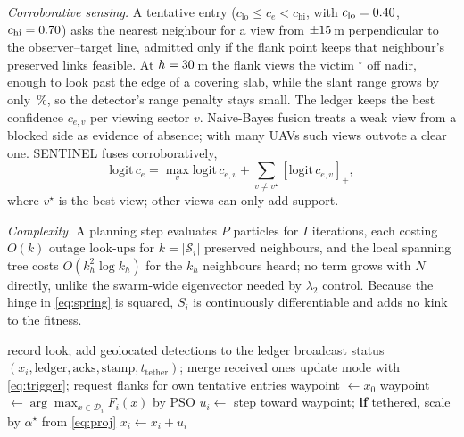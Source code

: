 \documentclass[conference]{IEEEtran}
\begin{document}
\emph{Corroborative sensing.} A tentative entry ($c_{\mathrm{lo}}\le c_e<c_{\mathrm{hi}}$, with
$c_{\mathrm{lo}}=0.40$, $c_{\mathrm{hi}}=0.70$) asks the nearest neighbour for a view from
$\pm15$\,m perpendicular to the observer--target line, admitted only if the flank point keeps
that neighbour's preserved links feasible. At $h=30$\,m the flank views the victim
\nFlankAngle$^\circ$ off nadir, enough to look past the edge of a covering slab, while the slant range
grows by only \nFlankSlant\,\%, so the detector's range penalty stays small. The ledger keeps the best confidence $c_{e,v}$ per viewing
sector $v$. Naive-Bayes fusion treats a weak view from a blocked side as evidence of absence; with many
UAVs such views outvote a clear one. SENTINEL fuses corroboratively,
\begin{equation}
\mathrm{logit}\,c_e=\max_v\mathrm{logit}\,c_{e,v}+\sum_{v\ne v^\star}[\mathrm{logit}\,c_{e,v}]_+,\label{eq:fusion}
\end{equation}
where $v^\star$ is the best view; other views can only add support.

\emph{Complexity.} A planning step evaluates $P$ particles for $I$ iterations, each costing $O(k)$
outage look-ups for $k=|\mathcal{S}_i|$ preserved neighbours, and the local spanning tree costs
$O(k_h^2\log k_h)$ for the $k_h$ neighbours heard; no term grows with $N$ directly, unlike the
swarm-wide eigenvector needed by $\lambda_2$ control. Because the hinge in \eqref{eq:spring} is
squared, $S_i$ is continuously differentiable and adds no kink to the fitness.

\begin{algorithm}[t]\small\caption{SENTINEL agent $i$ (every slot $\Delta t$)}\label{alg:agent}
\begin{algorithmic}[1]
\State record look; add geolocated detections to the ledger
\State broadcast status $(x_i,\text{ledger},\text{acks},\text{stamp},t_{\mathrm{tether}})$; merge received ones
  \State update mode with \eqref{eq:trigger}; request flanks for own tentative entries
   \State waypoint $\gets x_0$
  \Else \State waypoint $\gets\arg\max_{x\in\mathcal{D}_i}F_i(x)$ by PSO 
  \EndIf
\EndIf
\State $u_i\gets$ step toward waypoint; \textbf{if} tethered, scale by $\alpha^\star$ from \eqref{eq:proj}
\State $x_i\gets x_i+u_i$
\end{algorithmic}
\end{algorithm}
\end{document}

